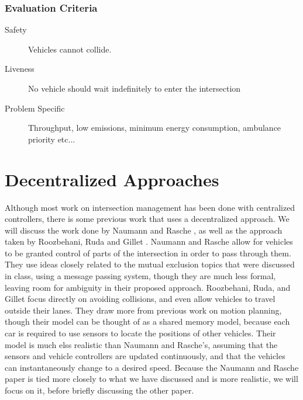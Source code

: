 \documentclass[12pt]{article}
\begin{document}
\subsubsection{Evaluation Criteria}

\begin{description}
\item[Safety] Vehicles cannot collide.   
\item[Liveness] No vehicle should wait indefinitely to enter the intersection
\item[Problem Specific]
Throughput, low emissions, minimum energy consumption, ambulance priority  etc...
\end{description}

\section{Decentralized Approaches}
\label{sec:decentralizedApproaches}
Although most work on intersection management has been done with centralized controllers, there is some previous work that uses a decentralized approach. We will discuss the work done by Naumann and Rasche \cite{naumann}, as well as the approach taken by Roozbehani, Ruda and Gillet \cite{roozbehani}. Naumann and Rasche allow for vehicles to be granted control of parts of the intersection in order to pass through them. They use ideas closely related to the mutual exclusion topics that were discussed in class, using a message passing system, though they are much less formal, leaving room for ambiguity in their proposed approach. Roozbehani, Ruda, and Gillet focus directly on avoiding collisions, and even allow vehicles to travel outside their lanes. They draw more from previous work on motion planning, though their model can be thought of as a shared memory model, because each car is required to use sensors to locate the positions of other vehicles. Their model is much elss realistic than Naumann and Rasche's, assuming that the sensors and vehicle controllers are updated continuously, and that the vehicles can instantaneously change to a desired speed. Because the Naumann and Rasche paper is tied more closely to what we have discussed and is more realistic, we will focus on it, before briefly discussing the other paper. 
\end{document}

